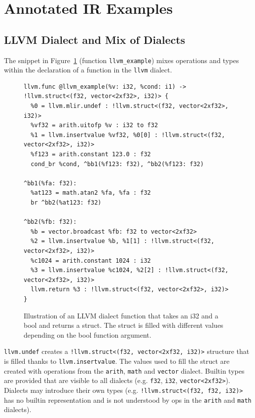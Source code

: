 \section{Annotated IR Examples}
\label{sec:annotated_examples}

\subsection{LLVM Dialect and Mix of Dialects}
\label{sec:appendix-llvm-mix-example}

The snippet in Figure~\ref{fig:llvm_dialect_example} (function \lstinline{llvm_example}) mixes operations and types within the declaration of a function in the \lstinline{llvm} dialect.

\begin{figure}[h!tb]
\begin{lstlisting}[language=mlir]
llvm.func @llvm_example(%v: i32, %cond: i1) -> !llvm.struct<(f32, vector<2xf32>, i32)> {
  %0 = llvm.mlir.undef : !llvm.struct<(f32, vector<2xf32>, i32)>
  %vf32 = arith.uitofp %v : i32 to f32
  %1 = llvm.insertvalue %vf32, %0[0] : !llvm.struct<(f32, vector<2xf32>, i32)>
  %f123 = arith.constant 123.0 : f32
  cond_br %cond, ^bb1(%f123: f32), ^bb2(%f123: f32)
  
^bb1(%fa: f32):
  %at123 = math.atan2 %fa, %fa : f32
  br ^bb2(%at123: f32)
  
^bb2(%fb: f32):
  %b = vector.broadcast %fb: f32 to vector<2xf32>
  %2 = llvm.insertvalue %b, %1[1] : !llvm.struct<(f32, vector<2xf32>, i32)>
  %c1024 = arith.constant 1024 : i32
  %3 = llvm.insertvalue %c1024, %2[2] : !llvm.struct<(f32, vector<2xf32>, i32)>
  llvm.return %3 : !llvm.struct<(f32, vector<2xf32>, i32)>
}
\end{lstlisting}
\caption{Illustration of an LLVM dialect function that takes an i32 and a bool and returns a struct. The struct is filled with different values depending on the bool function argument.}
\label{fig:llvm_dialect_example}
\end{figure}

\lstinline|llvm.undef| creates a \lstinline|!llvm.struct<(f32, vector<2xf32, i32)>| structure that is filled thanks to \lstinline|llvm.insertvalue|.
The values used to fill the struct are created with operations from the \lstinline|arith|, 
\lstinline|math| and \lstinline|vector| dialect. 
Builtin types are provided that are visible to all dialects (e.g. \lstinline|f32|, \lstinline|i32|, \lstinline|vector<2xf32>|). 
Dialects may introduce their own types (e.g. \lstinline|!llvm.struct<(f32, f32, i32)>| 
has no builtin representation and is not understood by ops in the \lstinline|arith| and \lstinline|math| dialects).

